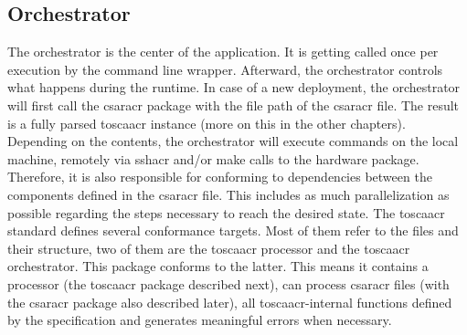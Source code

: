 \subsection{Orchestrator}
The orchestrator is the center of the application. It is getting called once per execution by the command line wrapper. Afterward, the orchestrator controls what happens during the runtime. In case of a new deployment, the orchestrator will first call the \gls{csaracr} package with the file path of the \gls{csaracr} file. The result is a fully parsed \gls{toscaacr} instance (more on this in the other chapters). Depending on the contents, the orchestrator will execute commands on the local machine, remotely via \gls{sshacr} and/or make calls to the hardware package. Therefore, it is also responsible for conforming to dependencies between the components defined in the \gls{csaracr} file. This includes as much parallelization as possible regarding the steps necessary to reach the desired state.
\newline
The \gls{toscaacr} standard defines several conformance targets. Most of them refer to the files and their structure, two of them are the \gls{toscaacr} processor and the \gls{toscaacr} orchestrator. This package conforms to the latter. This means it contains a processor (the \gls{toscaacr} package described next), can process \gls{csaracr} files (with the \gls{csaracr} package also described later), all \gls{toscaacr}-internal functions defined by the specification and generates meaningful errors when necessary.


